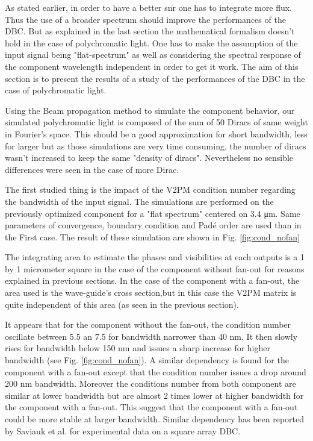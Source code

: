  As stated earlier, in order to have a better \gls{snr} one has to integrate more flux. Thus the use of a broader spectrum should improve the performances of the DBC. But as explained in the last section the mathematical formalism doesn't hold in the case of polychromatic light. One has to make the assumption of the input signal being "flat-spectrum" as well as considering the spectral response of the component wavelength independent in order to get it work. The aim of this section is to present the results of a study of the performances of the DBC in the case of polychromatic light. 
 
Using the Beam propagation method to simulate the component behavior, our simulated polychromatic light is composed of the sum of 50 Diracs of same weight in Fourier's space.  This should be a good
approximation for short bandwidth, less for larger but as those simulations are very time consuming,
the number of diracs wasn’t increased to keep the same "density of diracs". Nevertheless no sensible differences were seen in the case of more Dirac. 

The first studied thing is the impact of the V2PM condition number regarding the bandwidth of the input signal. The simulations are performed on the previously optimized component for a "flat spectrum" centered on 3.4 \si{\micro\meter}. Same parameters of convergence, boundary condition and Padé order are used than in the First case. The result of these simulation are shown in Fig.  \ref{fig:cond_nofan}

The integrating area to estimate the phases and visibilities at each outputs is a 1 by 1 micrometer square in the case of the component without fan-out for reasons explained in previous sections. In the case of the component with a fan-out, the area used is the wave-guide's cross section,but in this case the V2PM matrix is quite independent of this area (as seen in the previous section).

It appears that for the component without the fan-out, the
condition number oscillate between 5.5 an 7.5 for bandwidth narrower
than 40 nm. It then slowly rises for bandwidth below 150 nm and issues
a sharp increase for higher bandwidth (see Fig.
\ref{fig:cond_nofan}). A similar dependency is found for the component with a fan-out except that the condition number issues a drop around 200 nm bandwidth. Moreover the conditions number from both component are similar at lower bandwidth but are almost 2 times lower at higher bandwidth for the component with a fan-out. This suggest that the component with a fan-out could be more stable at larger bandwidth. Similar dependency has been reported by Saviauk et al. \cite{saviauk} for experimental data on a square array DBC.  

